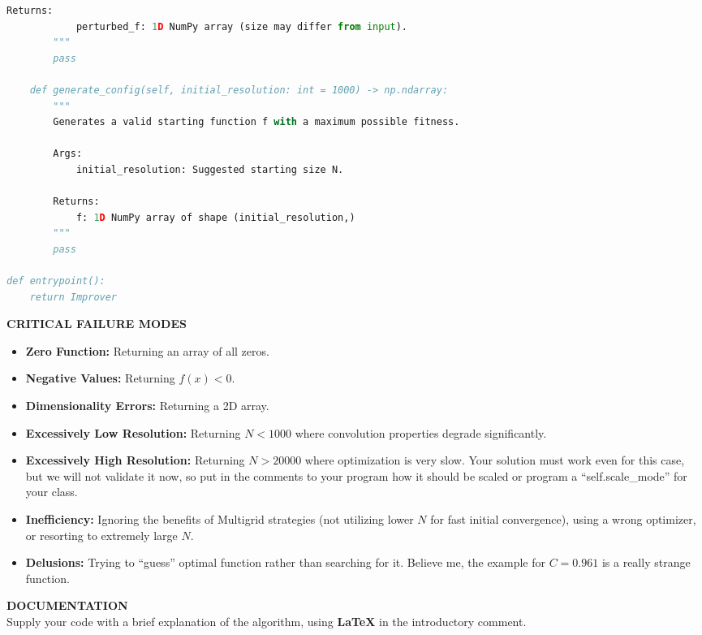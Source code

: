 \documentclass[sigconf]{acmart}
\begin{document}
\begin{paracol}{2}
\begin{lstlisting}[language=Python, frame=single, basicstyle=\ttfamily\scriptsize]
        Returns:
            perturbed_f: 1D NumPy array (size may differ from input).
        """
        pass

    def generate_config(self, initial_resolution: int = 1000) -> np.ndarray:
        """
        Generates a valid starting function f with a maximum possible fitness.

        Args:
            initial_resolution: Suggested starting size N.

        Returns:
            f: 1D NumPy array of shape (initial_resolution,)
        """
        pass

def entrypoint():
    return Improver
\end{lstlisting}

\noindent \textbf{CRITICAL FAILURE MODES}
\begin{itemize}
    \item \textbf{Zero Function:} Returning an array of all zeros.
    \item \textbf{Negative Values:} Returning $f(x) < 0$.
    \item \textbf{Dimensionality Errors:} Returning a 2D array.
    \item \textbf{Excessively Low Resolution:} Returning $N < 1000$ where convolution properties degrade significantly.
    \item \textbf{Excessively High Resolution:} Returning $N > 20000$ where optimization is very slow. Your solution must work even for this case, but we will not validate it now, so put in the comments to your program how it should be scaled or program a ``self.scale\_mode'' for your class. 
    \item \textbf{Inefficiency:} Ignoring the benefits of Multigrid strategies (not utilizing lower $N$ for fast initial convergence), using a wrong optimizer, or resorting to extremely large $N$.
    \item \textbf{Delusions:} Trying to ``guess'' optimal function rather than searching for it. Believe me, the example for $C = 0.961$ is a really strange function.
\end{itemize}

\noindent \textbf{DOCUMENTATION}\\
Supply your code with a brief explanation of the algorithm, using \textbf{LaTeX} in the introductory comment.
\end{paracol}

\onecolumn
\end{document}
